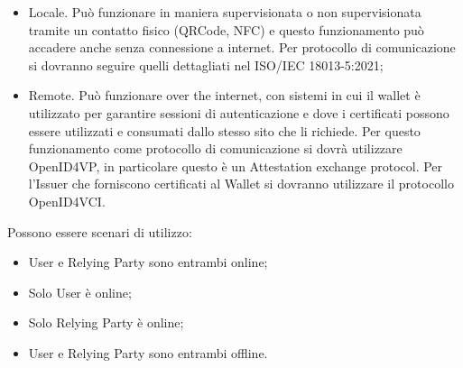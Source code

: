     \begin{itemize}
        \item Locale. Può funzionare in maniera supervisionata o non supervisionata tramite un contatto fisico (QRCode, NFC) e questo funzionamento può accadere anche senza connessione a internet. Per protocollo di comunicazione si dovranno seguire quelli dettagliati nel
        ISO/IEC 18013-5:2021;
        \item Remote. Può funzionare over the internet, con sistemi in cui il wallet è utilizzato per garantire sessioni di autenticazione e dove i certificati possono essere utilizzati e consumati dallo stesso sito che li richiede.
        Per questo funzionamento come protocollo di comunicazione si dovrà utilizzare OpenID4VP, in particolare questo è un Attestation exchange protocol.
        Per l'Issuer che forniscono certificati al Wallet si dovranno utilizzare il protocollo OpenID4VCI.
    \end{itemize}

    Possono essere scenari di utilizzo:
    \begin{itemize}
        \item User e Relying Party sono entrambi online;
        \item Solo User è online;
        \item Solo Relying Party è online;
        \item User e Relying Party sono entrambi offline.
    \end{itemize}